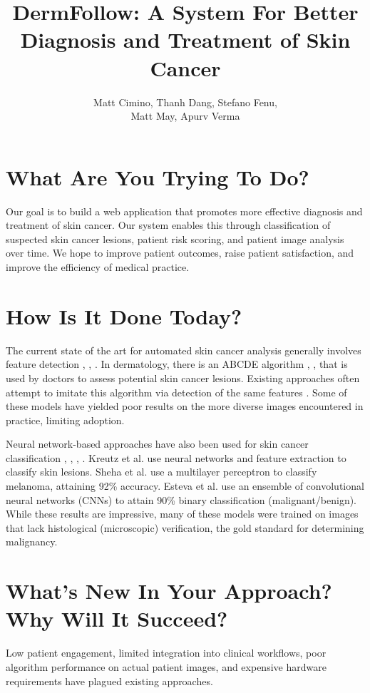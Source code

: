 \documentclass[a4paper,12pt]{article}
\title{DermFollow: A System For Better Diagnosis and Treatment of Skin Cancer}
\author{Matt Cimino, Thanh Dang, Stefano Fenu, \\Matt May, Apurv Verma}
\begin{document}
\maketitle

\section{What Are You Trying To Do?}
Our goal is to build a web application that promotes more effective diagnosis
and treatment of skin cancer. Our system enables this through classification of
suspected skin cancer lesions, patient risk scoring, and patient image analysis
over time. We hope to improve patient outcomes, raise patient satisfaction, and
improve the efficiency of medical practice.

\section{How Is It Done Today?}
The current state of the art for automated skin cancer analysis generally
involves feature detection \cite{DBLP:journals/eswa/LeeC15},
\cite{ganster2001automated}, \cite{rubegni2002automated}. In dermatology,
there is an ABCDE algorithm \cite{thomas1998semiological},
\cite{rigel2005abcde}, \cite{strayer2003diagnosing} that is used by doctors to
assess potential skin cancer lesions. Existing approaches often attempt to
imitate this algorithm via detection of the same features
\cite{zagrouba2004prelimary}. Some of these models have yielded
poor results on the more diverse images encountered in practice, limiting
adoption.

Neural network-based approaches have also been used for skin cancer
classification \cite{sigurdsson2004detection}, \cite{ercal1994neural},
\cite{bostock1993towards}, \cite{chang2009applying}. Kreutz et al.
\cite{Kreutz2001} use neural networks and feature extraction to classify
skin lesions. Sheha et al. \cite{sheha2012automatic} use a multilayer perceptron
to classify melanoma, attaining 92\% accuracy. Esteva et al.
\cite{esteva-skincancer-manuscript} use an ensemble of convolutional neural
networks (CNNs) to attain 90\% binary classification (malignant/benign). While
these results are impressive, many of these models were trained on images
that lack histological (microscopic) verification, the gold standard for
determining malignancy.

\section{What's New In Your Approach? Why Will It Succeed?}
Low patient engagement, limited integration into clinical workflows, poor
algorithm performance on actual patient images, and expensive hardware
requirements have plagued existing approaches.
\end{document}
